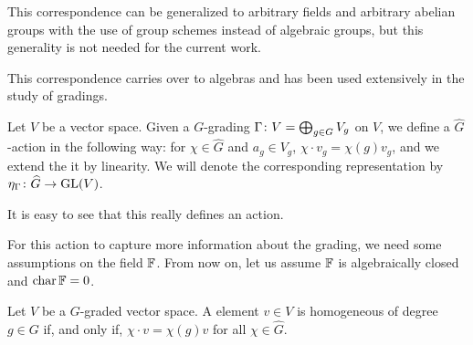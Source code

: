 \begin{remark}
    This correspondence can be generalized to arbitrary fields and arbitrary abelian groups with the use of group schemes instead of algebraic groups, but this generality is not needed for the current work.
\end{remark}

This correspondence carries over to algebras and has been used extensively in the study of gradings.






\begin{defi}
    Let $V$ be a vector space. 
    Given a $G$-grading $\Gamma\colon V= \bigoplus_{g\in G} V_g$ on $V$, we define a $\widehat G$-action in the following way: for $\chi \in \widehat G$ and $a_g \in V_g$, $\chi \cdot v_g = \chi(g)v_g$, and we extend the it by linearity. 
    We will denote the corresponding representation by $\eta_\Gamma\colon \widehat G \to \operatorname{GL}(V)$.
\end{defi}

It is easy to see that this really defines an action. 

For this action to capture more information about the grading, we need some assumptions on the field $\mathbb{F}$. 
From now on, let us assume $\mathbb{F}$ is algebraically closed and $\operatorname{char} \mathbb{F} = 0$.

\begin{lemma}
    Let $V$ be a $G$-graded vector space. 
    A element $v\in V$ is homogeneous of degree $g\in G$ if, and only if, $\chi\cdot v = \chi(g)v$ for all $\chi \in \widehat G$.
\end{lemma}

